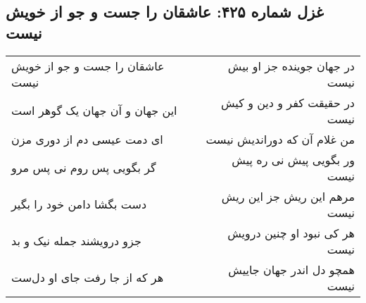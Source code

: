 \begin{center}
\section*{غزل شماره ۴۲۵: عاشقان را جست و جو از خویش نیست}
\label{sec:0425}
\begin{longtable}{l p{0.5cm} r}
عاشقان را جست و جو از خویش نیست
&&
در جهان جوینده جز او بیش نیست
\\
این جهان و آن جهان یک گوهر است
&&
در حقیقت کفر و دین و کیش نیست
\\
ای دمت عیسی دم از دوری مزن
&&
من غلام آن که دوراندیش نیست
\\
گر بگویی پس روم نی پس مرو
&&
ور بگویی پیش نی ره پیش نیست
\\
دست بگشا دامن خود را بگیر
&&
مرهم این ریش جز این ریش نیست
\\
جزو درویشند جمله نیک و بد
&&
هر کی نبود او چنین درویش نیست
\\
هر که از جا رفت جای او دل‌ست
&&
همچو دل اندر جهان جاییش نیست
\\
\end{longtable}
\end{center}

